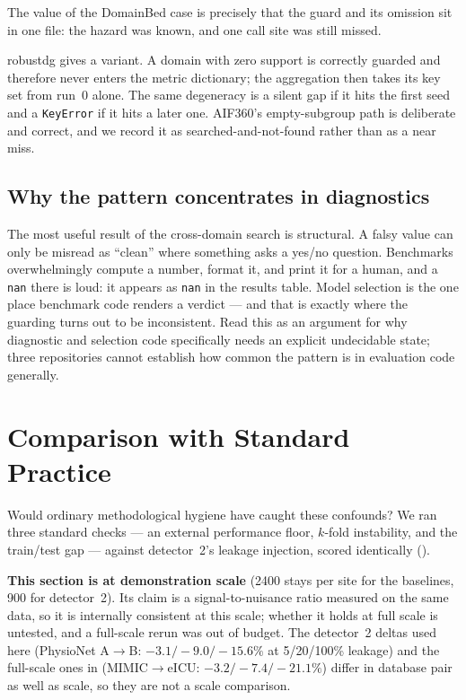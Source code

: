 \documentclass[pmlr,twocolumn,10pt]{jmlr}
\begin{document}
The value of the DomainBed case is precisely that the guard and its omission sit
in one file: the hazard was known, and one call site was still missed.

robustdg gives a variant. A domain with zero support is correctly guarded and
therefore never enters the metric dictionary; the aggregation then takes its key
set from run~0 alone. The same degeneracy is a silent gap if it hits the first
seed and a \texttt{KeyError} if it hits a later one. AIF360's empty-subgroup path
is deliberate and correct, and we record it as searched-and-not-found rather
than as a near miss.

\subsection{Why the pattern concentrates in diagnostics}

The most useful result of the cross-domain search is structural. A falsy value
can only be misread as ``clean'' where something asks a yes/no question.
Benchmarks overwhelmingly compute a number, format it, and print it for a human,
and a \texttt{nan} there is loud: it appears as \texttt{nan} in the results
table. Model selection is the one place benchmark code renders a verdict --- and
that is exactly where the guarding turns out to be inconsistent. Read this as an
argument for why diagnostic and selection code specifically needs an explicit
undecidable state; three repositories cannot establish how common the pattern is
in evaluation code generally.

\section{Comparison with Standard Practice}
\label{sec:baselines}

Would ordinary methodological hygiene have caught these confounds? We ran three
standard checks --- an external performance floor, $k$-fold instability, and the
train/test gap --- against detector~2's leakage injection, scored identically
().

\textbf{This section is at demonstration scale} (2400 stays per site for the
baselines, 900 for detector~2). Its claim is a signal-to-nuisance ratio measured
on the same data, so it is internally consistent at this scale; whether it holds
at full scale is untested, and a full-scale rerun was out of budget. The
detector~2 deltas used here (PhysioNet A$\to$B: $-3.1/-9.0/-15.6\%$ at
5/20/100\% leakage) and the full-scale ones in 
(MIMIC$\to$eICU: $-3.2/-7.4/-21.1\%$) differ in database pair as well as scale,
so they are not a scale comparison.
\end{document}
